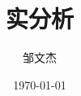\documentclass[lang=cn,newtx,10pt,sCheme=Chinese]{../../Template/elegantbook}
\title{实分析}
\author{邹文杰}
\institute{无}
\date{\today}
\begin{document}

\maketitle
\frontmatter

\tableofcontents%

\mainmatter
\everymath{\displaystyle} %






% 

% 

% 

% 

% 

% 

% 

% 

% 

% 

% 



\end{document}
